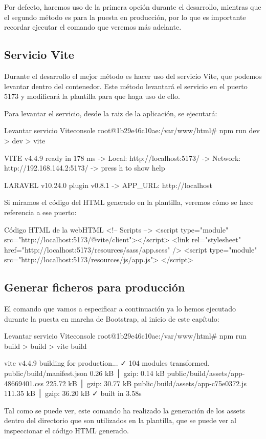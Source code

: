 Por defecto, haremos uso de la primera opción durante el desarrollo, mientras que el segundo método es para la puesta en producción, por lo que es importante recordar ejecutar el comando que veremos más adelante.


\subsection{Servicio Vite}
Durante el desarrollo el mejor método es hacer uso del servicio Vite, que podemos levantar dentro del contenedor. Este método levantará el servicio en el puerto 5173 y modificará la plantilla para que haga uso de ello.

Para levantar el servicio, desde la raiz de la aplicación, se ejecutará:

\begin{mycode}{Levantar servicio Vite}{console}{}
root@1b29e46c10ae:/var/www/html# npm run dev
> dev
> vite

VITE v4.4.9  ready in 178 ms
->  Local:   http://localhost:5173/
->  Network: http://192.168.144.2:5173/
->  press h to show help

LARAVEL v10.24.0  plugin v0.8.1
->  APP_URL: http://localhost
\end{mycode}

Si miramos el código del HTML generado en la plantilla, veremos cómo se hace referencia a ese puerto:

\begin{mycode}{Código HTML de la web}{HTML}{{\small }}
<!-- Scripts -->
<script type="module" src="http://localhost:5173/@vite/client"></script>
<link rel="stylesheet" href="http://localhost:5173/resources/sass/app.scss" />
<script type="module" src="http://localhost:5173/resources/js/app.js">
</script>
\end{mycode}


\subsection{Generar ficheros para producción}

El comando que vamos a especificar a continuación ya lo hemos ejecutado durante la puesta en marcha de Bootstrap, al inicio de este capítulo:

\begin{mycode}{Levantar servicio Vite}{console}{}
root@1b29e46c10ae:/var/www/html# npm run build
> build
> vite build

vite v4.4.9 building for production...
✓ 104 modules transformed.
public/build/manifest.json              0.26 kB │ gzip:  0.14 kB
public/build/assets/app-48669401.css  225.72 kB │ gzip: 30.77 kB
public/build/assets/app-c75e0372.js   111.35 kB │ gzip: 36.20 kB
✓ built in 3.58s
\end{mycode}

Tal como se puede ver, este comando ha realizado la generación de los assets dentro del directorio  que son utilizados en la plantilla, que se puede ver al inspeccionar el código HTML generado.